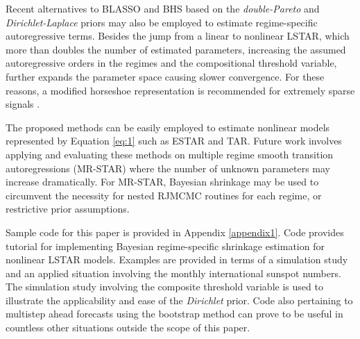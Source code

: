 Recent alternatives to BLASSO and BHS based on the \textit{double-Pareto} \citep{Armagan2013} and \textit{Dirichlet-Laplace} priors \citep{Bhattacharya2015} may also be employed to estimate regime-specific autoregressive terms. Besides the jump from a linear to nonlinear LSTAR, which more than doubles the number of estimated parameters, increasing the assumed autoregressive orders in the regimes and the compositional threshold variable, further expands the parameter space causing slower convergence. For these reasons, a modified horseshoe representation is recommended for extremely sparse signals \citep{Bhadra2016}. 

The proposed methods can be easily employed to estimate nonlinear models represented by Equation \ref{eq:1} such as ESTAR and TAR. Future work involves applying and evaluating these methods on multiple regime smooth transition autoregressions (MR-STAR) where the number of unknown parameters may increase dramatically. For MR-STAR, Bayesian shrinkage may be used to circumvent the necessity for nested RJMCMC routines for each regime, or restrictive prior assumptions.

Sample code for this paper is provided in Appendix \ref{appendix1}. Code provides tutorial for implementing Bayesian regime-specific shrinkage estimation for nonlinear LSTAR models. Examples are provided in terms of a simulation study and an applied situation involving the monthly international sunspot numbers. The simulation study involving the composite threshold variable is used to illustrate the applicability and ease of the \textit{Dirichlet} prior. Code also pertaining to multistep ahead forecasts using the bootstrap method can prove to be useful in countless other situations outside the scope of this paper.


